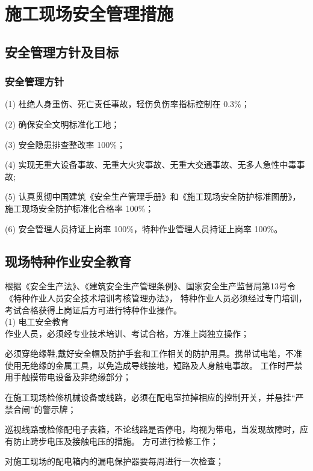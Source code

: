 \section{施工现场安全管理措施}

\subsection{安全管理方针及目标}
\subsubsection{安全管理方针}

(1) 杜绝人身重伤、死亡责任事故，轻伤负伤率指标控制在 0.3\%；

(2) 确保安全文明标准化工地；

(3) 安全隐患排查整改率 100\%；

(4) 实现无重大设备事故、无重大火灾事故、无重大交通事故、无多人急性中毒事故;

(5) 认真贯彻中国建筑《安全生产管理手册》和《施工现场安全防护标准图册》，施工现场安全防护标准化合格率 100\%；

(6) 安全管理人员持证上岗率 100\%，特种作业管理人员持证上岗率 100\%。

\subsection{现场特种作业安全教育}

根据《安全生产法》、《建筑安全生产管理条例》、国家安全生产监督局第13号令《特种作业人员安全技术培训考核管理办法》，
特种作业人员必须经过专门培训，考试合格获得上岗证后方可进行特种作业操作。\\

(1) 电工安全教育\\

 作业人员，必须经专业技术培训、考试合格，方准上岗独立操作；

 必须穿绝缘鞋,戴好安全帽及防护手套和工作相关的防护用具。携带试电笔，不准使用无绝缘的金属工具，以免造成导线接地，短路及人身触电事故。
工作时严禁用手触摸带电设备及非绝缘部分；

 在施工现场检修机械设备或线路，必须在配电室拉掉相应的控制开关，并悬挂“严禁合闸”的警示牌；

 巡视线路或检修配电子表箱，不论线路是否停电，均视为带电，当发现故障时，应有防止跨步电压及接触电压的措施。
方可进行检修工作；

 对施工现场的配电箱内的漏电保护器要每周进行一次检查；\\


